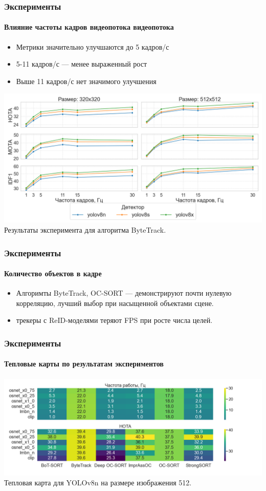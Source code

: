 \documentclass{beamer} %
\begin{document}
\begin{frame}
  \frametitle{Эксперименты}
  \framesubtitle{Влияние частоты кадров видеопотока видеопотока}
  \begin{itemize}
    \item Метрики значительно улучшаются до 5 кадров/с
    \item 5-11 кадров/с — менее выраженный рост
    \item Выше 11 кадров/с нет значимого улучшения
  \end{itemize}
  \centering
  \includegraphics[width=0.7\linewidth]{images/plots/fps_vs_metric/ByteTrack.png}\\
  \small Результаты эксперимента для алгоритма ByteTrack.
\end{frame}

\begin{frame}
  \frametitle{Эксперименты}
  \framesubtitle{Количество объектов в кадре}
  
  \begin{itemize}
    \item Алгоримты ByteTrack, OC-SORT — демонстрируют почти нулевую корреляцию, лучший выбор при насыщенной объектами сцене.
    \item трекеры с ReID-моделями теряют FPS при росте числа целей.
  \end{itemize}

\end{frame}

\begin{frame}
  \frametitle{Эксперименты}
  \framesubtitle{Тепловые карты по результатам экспериментов}
  \centering
  \includegraphics[width=\linewidth]{images/plots/heatmap_fps_hota_vs_tracker_reid/heatmap_fps_hota_yolov8n_size512.png}\\
  \small Тепловая карта для YOLOv8n на размере изображения 512.
\end{frame}
\end{document}

